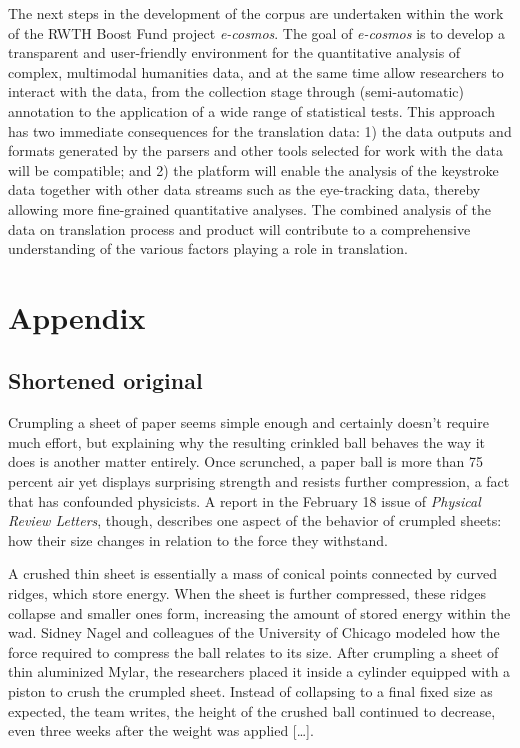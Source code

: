 \documentclass[output=paper]{LSP/langsci}
\begin{document}
The next steps in the development of the corpus are undertaken within the work of the RWTH Boost Fund project \textit{e-cosmos}. The goal of \textit{e-cosmos} is to develop a transparent and user-friendly environment for the quantitative analysis of complex, multimodal humanities data, and at the same time allow researchers to interact with the data, from the collection stage through (semi-automatic) annotation to the application of a wide range of statistical tests. This approach has two immediate consequences for the translation data: 1) the data outputs and formats generated by the parsers and other tools selected for work with the data will be compatible; and 2) the platform will enable the analysis of the keystroke data together with other data streams such as the eye-tracking data, thereby allowing more fine-grained quantitative analyses. The combined analysis of the data on translation process and product will contribute to a comprehensive understanding of the various factors playing a role in translation.  


\section*{Appendix}

\subsection*{Shortened original}
Crumpling a sheet of paper seems simple enough and certainly doesn't require much effort, but explaining why the resulting crinkled ball behaves the way it does is another matter entirely. Once scrunched, a paper ball is more than 75 percent air yet displays surprising strength and resists further compression, a fact that has confounded physicists. A report in the February 18 issue of \textit{Physical Review Letters}, though, describes one aspect of the behavior of crumpled sheets: how their size changes in relation to the force they withstand.
 
A crushed thin sheet is essentially a mass of conical points connected by curved ridges, which store energy. When the sheet is further compressed, these ridges collapse and smaller ones form, increasing the amount of stored energy within the wad. Sidney Nagel and colleagues of the University of Chicago modeled how the force required to compress the ball relates to its size. After crumpling a sheet of thin aluminized Mylar, the researchers placed it inside a cylinder equipped with a piston to crush the crumpled sheet. Instead of collapsing to a final fixed size as expected, the team writes, the height of the crushed ball continued to decrease, even three weeks after the weight was applied […].
 
\end{document}
